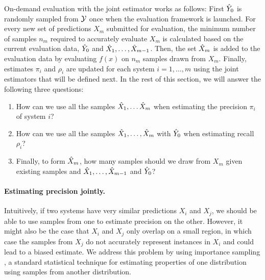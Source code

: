 On-demand evaluation with the joint estimator works as follows:
First ${\hat{Y}}_0$ is randomly sampled from $\mathcal{Y}$ once when the evaluation framework is launched.
For every new set of predictions $X_m$ submitted for evaluation, the minimum number of samples $n_m$ required to accurately evaluate $X_m$ is calculated based on the current evaluation data, ${\hat{Y}}_0$ and ${\hat{X}}_1, \ldots, {\hat{X}}_{m-1}$.
Then, the set ${\hat{X}}_m$ is added to the evaluation data by evaluating $f(x)$ on $n_m$ samples drawn from $X_m$.
Finally, estimates $\pi_i$ and $\rho_i$ are updated for each system $i = 1,\ldots,m$ using the joint estimators that will be defined next.
In the rest of this section, we will answer the following three questions:
\begin{enumerate}
  \item How can we use all the samples ${\hat{X}}_1, \ldots {\hat{X}}_m$ when estimating the precision $\pi_i$ of system $i$?
  \item How can we use all the samples ${\hat{X}}_1, \ldots, {\hat{X}}_m$ with ${\hat{Y}}_0$ when estimating recall $\rho_i$?
  \item Finally, to form ${\hat{X}}_m$, how many samples should we draw from $X_m$ given existing samples and ${\hat{X}}_1, \ldots, {\hat{X}}_{m-1}$ and ${\hat{Y}}_0$?
\end{enumerate}

\paragraph{Estimating precision jointly.}
Intuitively, if two systems have very similar predictions $X_i$ and $X_j$, we should be able to use samples from one to estimate precision on the other.
However, it might also be the case that $X_i$ and $X_j$ only overlap on a small region, in which case the samples from $X_j$ do not accurately represent instances in $X_i$ and could lead to a biased estimate.
We address this problem by using importance sampling \citep{owen2013monte}, a standard statistical technique for estimating properties of one distribution using samples from another distribution.

